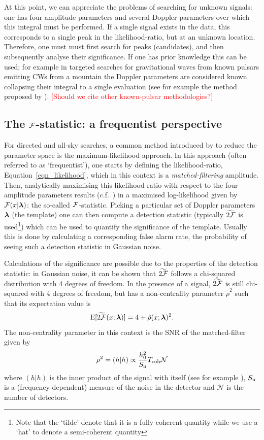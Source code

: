 \documentclass[aps, prd, twocolumn, superscriptaddress, floatfix, showpacs, nofootinbib, longbibliography]{revtex4-1}
\newcommand{\comment}[1]{\textcolor{red}{[#1]}}
\begin{document}
At this point, we can appreciate the problems of searching for unknown signals:
one has four amplitude parameters and several Doppler parameters over which
this integral must be performed. If a single signal exists in the data, this
corresponds to a single peak in the likelihood-ratio, but at an unknown
location. Therefore, one must must first search for peaks (candidates), and
then subsequently analyse their significance. If one has prior knowledge this
can be used; for example in targeted searches for gravitational waves from
known pulsars emitting CWs from a mountain the Doppler parameters are
considered known collapsing their integral to a single evaluation (see for
example the method proposed by \citet{dupuis2005}).
\comment{Should we cite other known-pulsar methodologies?}

\subsection{The ${\mathcal{F}}$-statistic: a frequentist perspective}

For directed and all-sky searches, a common method introduced by
\citet{jks1998} to reduce the parameter space is the maximum-likelihood
approach. In this approach (often referred to as `frequentist'), one starts by
defining the likelihood-ratio, Equation~\eqref{eqn_likelihood}, which in this
context is a \emph{matched-filtering} amplitude. Then, analytically maximising
this likelihood-ratio with respect to the four amplitude parameters results
(c.f.~\citet{prix2009}) in a maximised log-likelihood given by ${\mathcal{F}}(x|
\boldsymbol{\mathbf{\lambda}})$: the so-called ${\mathcal{F}}$-statistic. Picking a particular set of Doppler
parameters $\boldsymbol{\mathbf{\lambda}}$ (the template) one can then compute a detection statistic
(typically $\widetilde{2{\mathcal{F}}}$ is used\footnote{Note that the `tilde' denote that it
is a fully-coherent quantity while we use a `hat' to denote a semi-coherent
quantity}) which can be used to quantify the significance of the template.
Usually this is done by calculating a corresponding false alarm rate, the
probability of seeing such a detection statistic in Gaussian noise.

Calculations of the significance are possible due to the properties of the
detection statistic: in Gaussian noise, it can be shown \citep{jks1998,
cutlershutz2005} that $\widetilde{2{\mathcal{F}}}$ follows a chi-squared distribution with
4 degrees of freedom. In the presence of a signal, $\widetilde{2{\mathcal{F}}}$ is
still chi-squared with 4 degrees of freedom, but has a non-centrality parameter
$\tilde{\rho}^{2}$ such that its expectation value is
\begin{equation}
\textrm{E}[\widetilde{2{\mathcal{F}}}(x; \boldsymbol{\mathbf{\lambda}})] = 4 + \tilde{\rho}(x; \boldsymbol{\mathbf{\lambda}})^2.
\label{eqn_twoF_expectation}
\end{equation}
The non-centrality parameter in this context is the SNR of the matched-filter
given by
\begin{equation}
\rho^{2} = (h | h) \propto \frac{h_0^2}{S_{\rm n}}T_{\rm coh} \mathcal{N}
\end{equation}
where $(h|h)$ is the inner product of the signal with itself (see for example
\citet{prix2009}), $S_{\rm n}$ is a (frequency-dependent) measure of the noise in
the detector and $\mathcal{N}$ is the number of detectors.
\end{document}
